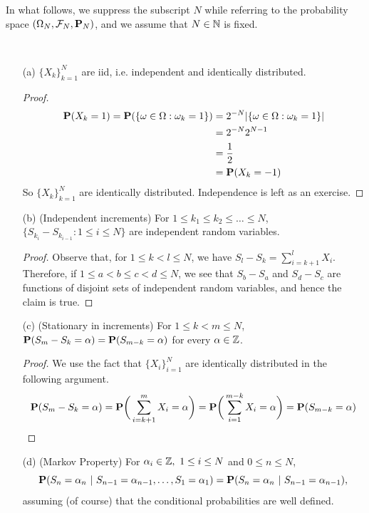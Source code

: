 \documentclass[main]{subfiles}
\begin{document}
In what follows, we suppress the subscript $ N $ while referring to the probability space $ (\Omega_N,\SF_N, \P_N) $, and we assume that $ N\in\N $ is fixed.
\begin{obs}
    $\,$ \normalfont
    \begin{enumerate}
        \item[(a)] $\{X_k\}_{k=1}^N $ are iid, i.e. independent and identically distributed.
            \begin{proof}
                \begin{align*}
                    \P(X_k=1)=\P(\{\omega\in\Omega:\omega_k=1\}) & =2^{-N} |\{\omega\in\Omega:\omega_k=1\}| \\
                                                                 & =2^{-N}2^{N-1}                           \\
                                                                 & =\frac{1}{2}                             \\
                                                                 & =\P(X_k=-1)
                \end{align*}
                So $ \{X_k\}_{k=1}^N $ are identically distributed. Independence is left as an exercise.
            \end{proof}
            \item[(b)](Independent increments) For $ 1\le k_1\le k_2\le \ldots\le N $, $ \{S_{k_i}-S_{k_{i-1}}:1\le i\le N\} $ are independent random variables.

            \begin{proof}
                Observe that, for $ 1\le k<l\le N $, we have $ S_l-S_k=\sum_{i=k+1}^lX_i $. Therefore, if $ 1\le a<b\le c<d\le N $, we see that $ S_b-S_a $ and $ S_d-S_c $ are functions of disjoint sets of independent random variables, and hence the claim is true.
            \end{proof}

            

            \item[(c)](Stationary in increments) For $ 1\le k<m\le N $, $ \P(S_m-S_k=\alpha)=\P(S_{m-k}=\alpha)$ for every $ \alpha\in\Z $.

            \begin{proof}
                We use the fact that $ \{X_i\}_{i=1}^N $ are identically distributed in the following argument. $$ \P(S_m-S_k=\alpha)=\P\bigg(\sum_{i=k+1}^mX_i=\alpha\bigg)=\P\bigg(\sum_{i=1}^{m-k}X_i=\alpha\bigg)=\P(S_{m-k}=\alpha) $$
            \end{proof}
            \item[(d)](Markov Property) For $ \alpha_i\in\Z,\ 1\le i\le N $ and $ 0\le n\le N $, \[ \P(S_n=\alpha_n\ |\ S_{n-1}=\alpha_{n-1}, \ldots, S_1=\alpha_1)=\P(S_n=\alpha_n\ |\ S_{n-1}=\alpha_{n-1}), \] assuming (of course) that the conditional probabilities are well defined.


\end{enumerate}
\end{obs}
\end{document}

